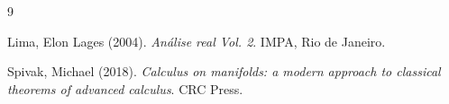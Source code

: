 \documentclass[a4paper, 17pt]{extarticle}
\begin{document}
{\small 

 







 
 






\begin{thebibliography}{9}


Lima, Elon Lages (2004). \textit{An{\'a}lise real Vol. 2}. IMPA, Rio de Janeiro.

Spivak, Michael (2018). \textit{Calculus on manifolds: a modern approach to classical theorems of advanced calculus}. CRC Press.
\end{thebibliography}
}

\end{document}

